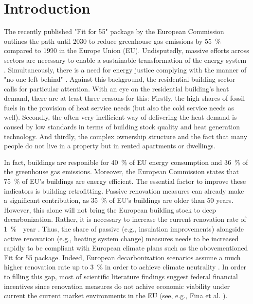 \section{Introduction}
The recently published "Fit for 55" package \cite{european_commission_european_2019} by the European Commission outlines the path until 2030 to reduce greenhouse gas emissions by \SI{55}{\%} compared to 1990 in the Europe Union (EU). Undisputedly, massive efforts across sectors are necessary to enable a sustainable transformation of the energy system \cite{korkmaz2020comparison}. Simultaneously, there is a need for energy justice complying with the manner of "no one left behind" \cite{sovacool2019decarbonization}. Against this background, the residential building sector calls for particular attention. With an eye on the residential building's heat demand, there are at least three reasons for this: Firstly, the high shares of fossil fuels in the provision of heat service needs (but also the cold service needs as well). Secondly, the often very inefficient way of delivering the heat demand is caused by low standards in terms of building stock quality and heat generation technology. And thirdly, the complex ownership structure and the fact that many people do not live in a property but in rented apartments or dwellings.\vspace{0.5cm}

In fact, buildings are responible for \SI{40}{\%} of EU energy consumption and \SI{36}{\%} of the greenhouse gas emissions. Moreover, the European Commission states that \SI{75}{\%} of EU's buildings are energy efficient. The essential factor to improve these indicators is building retrofitting. Passive renovation measures can already make a significant contribution, as \SI{35}{\%} of EU's buildings are older than \SI{50}{} years. However, this alone will not bring the European building stock to deep decarbonization. Rather, it is necessary to increase the current renovation rate of \SI{1}{\% \per year} \cite{eurocombuildings2021}. Thus, the share of passive (e.g., insulation improvements) alongside active renovation (e.g., heating system change) measures needs to be increased rapidly to be compliant with European climate plans such as the abovementioned Fit for 55 package. Indeed, European decarbonization scenarios assume a much higher renovation rate up to \SI{3}{\%} in order to achieve climate neutrality \cite{korkmaz2020comparison}. In order to filling this gap, most of scientific literature findings suggest federal financial incentives since renovation measures do not achive economic viability under current the current market environments in the EU (see, e.g., Fina et al. \cite{fina2019profitability}).\vspace{0.5cm}

